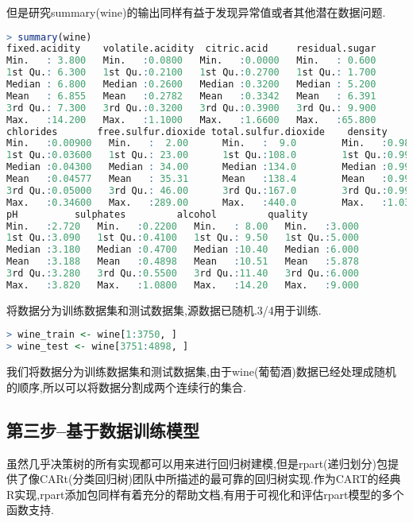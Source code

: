 \documentclass[11pt,a4paper,oneside]{book}
\begin{document}
但是研究summary(wine)的输出同样有益于发现异常值或者其他潜在数据问题.
\begin{lstlisting}[language=r]
> summary(wine)
fixed.acidity    volatile.acidity  citric.acid     residual.sugar  
Min.   : 3.800   Min.   :0.0800   Min.   :0.0000   Min.   : 0.600  
1st Qu.: 6.300   1st Qu.:0.2100   1st Qu.:0.2700   1st Qu.: 1.700  
Median : 6.800   Median :0.2600   Median :0.3200   Median : 5.200  
Mean   : 6.855   Mean   :0.2782   Mean   :0.3342   Mean   : 6.391  
3rd Qu.: 7.300   3rd Qu.:0.3200   3rd Qu.:0.3900   3rd Qu.: 9.900  
Max.   :14.200   Max.   :1.1000   Max.   :1.6600   Max.   :65.800  
chlorides       free.sulfur.dioxide total.sulfur.dioxide    density      
Min.   :0.00900   Min.   :  2.00      Min.   :  9.0        Min.   :0.9871  
1st Qu.:0.03600   1st Qu.: 23.00      1st Qu.:108.0        1st Qu.:0.9917  
Median :0.04300   Median : 34.00      Median :134.0        Median :0.9937  
Mean   :0.04577   Mean   : 35.31      Mean   :138.4        Mean   :0.9940  
3rd Qu.:0.05000   3rd Qu.: 46.00      3rd Qu.:167.0        3rd Qu.:0.9961  
Max.   :0.34600   Max.   :289.00      Max.   :440.0        Max.   :1.0390  
pH          sulphates         alcohol         quality     
Min.   :2.720   Min.   :0.2200   Min.   : 8.00   Min.   :3.000  
1st Qu.:3.090   1st Qu.:0.4100   1st Qu.: 9.50   1st Qu.:5.000  
Median :3.180   Median :0.4700   Median :10.40   Median :6.000  
Mean   :3.188   Mean   :0.4898   Mean   :10.51   Mean   :5.878  
3rd Qu.:3.280   3rd Qu.:0.5500   3rd Qu.:11.40   3rd Qu.:6.000  
Max.   :3.820   Max.   :1.0800   Max.   :14.20   Max.   :9.000  
\end{lstlisting}

将数据分为训练数据集和测试数据集,源数据已随机.3/4用于训练.
\begin{lstlisting}[language=r]
> wine_train <- wine[1:3750, ]
> wine_test <- wine[3751:4898, ]
\end{lstlisting}
我们将数据分为训练数据集和测试数据集,由于wine(葡萄酒)数据已经处理成随机的顺序,所以可以将数据分割成两个连续行的集合.

\subsection{第三步--基于数据训练模型}
虽然几乎决策树的所有实现都可以用来进行回归树建模,但是rpart(递归划分)包提供了像CARt(分类回归树)团队中所描述的最可靠的回归树实现.作为CART的经典R实现,rpart添加包同样有着充分的帮助文档,有用于可视化和评估rpart模型的多个函数支持.
\end{document}
